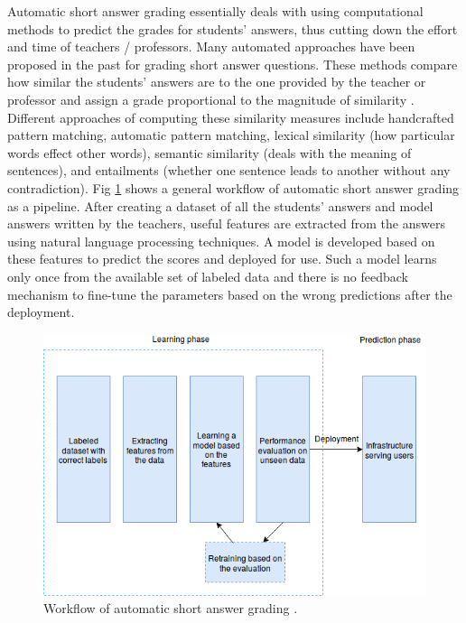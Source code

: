 Automatic short answer grading essentially deals with using computational methods to predict the grades for students' answers, thus cutting down the effort and time of teachers / professors. Many automated approaches have been proposed in the past for grading short answer questions. These methods compare how similar the students' answers are to the one provided by the teacher or professor and assign a grade proportional to the magnitude of similarity \cite{Mohler2011}. Different approaches of computing these similarity measures include handcrafted pattern matching, automatic pattern matching, lexical similarity (how particular words effect other words), semantic similarity (deals with the meaning of sentences), and entailments (whether one sentence leads to another without any contradiction). Fig \ref{auto_workflow} shows a general workflow of automatic short answer grading as a pipeline. After creating a dataset of all the students' answers and model answers written by the teachers, useful features are extracted from the answers using natural language processing techniques. A model is developed based on these features to predict the scores and deployed for use. Such a model learns only once from the available set of labeled data and there is no feedback mechanism to fine-tune the parameters based on the wrong predictions after the deployment.

\vspace{3mm}
\begin{figure}[h!]
	\centering
	\includegraphics[scale=0.6]{images/simpler_model_1}
	\caption{Workflow of automatic short answer grading \cite{Burrows2015}.}
	\label{auto_workflow}
\end{figure}

